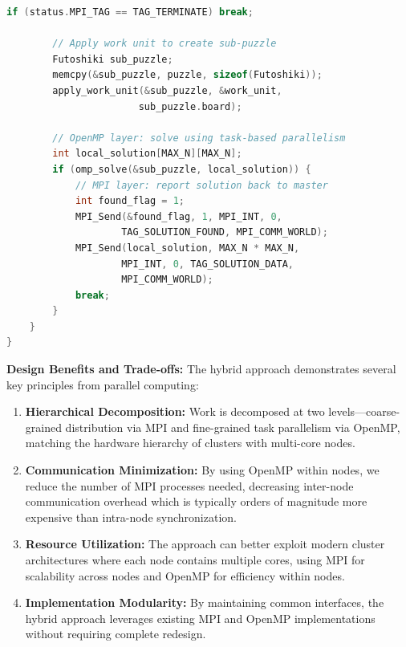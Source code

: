 \begin{enumerate}
\begin{lstlisting}[language=C, caption=Hybrid worker combining MPI and OpenMP, label={listing:hybrid_worker}]
        if (status.MPI_TAG == TAG_TERMINATE) break;
        
        // Apply work unit to create sub-puzzle
        Futoshiki sub_puzzle;
        memcpy(&sub_puzzle, puzzle, sizeof(Futoshiki));
        apply_work_unit(&sub_puzzle, &work_unit, 
                       sub_puzzle.board);
        
        // OpenMP layer: solve using task-based parallelism
        int local_solution[MAX_N][MAX_N];
        if (omp_solve(&sub_puzzle, local_solution)) {
            // MPI layer: report solution back to master
            int found_flag = 1;
            MPI_Send(&found_flag, 1, MPI_INT, 0, 
                    TAG_SOLUTION_FOUND, MPI_COMM_WORLD);
            MPI_Send(local_solution, MAX_N * MAX_N, 
                    MPI_INT, 0, TAG_SOLUTION_DATA, 
                    MPI_COMM_WORLD);
            break;
        }
    }
}
\end{lstlisting}

\textbf{Design Benefits and Trade-offs:}
The hybrid approach demonstrates several key principles from parallel computing:

\begin{enumerate}
    \item \textbf{Hierarchical Decomposition:} Work is decomposed at two levels—coarse-grained distribution via MPI and fine-grained task parallelism via OpenMP, matching the hardware hierarchy of clusters with multi-core nodes.
    
    \item \textbf{Communication Minimization:} By using OpenMP within nodes, we reduce the number of MPI processes needed, decreasing inter-node communication overhead which is typically orders of magnitude more expensive than intra-node synchronization.
    
    \item \textbf{Resource Utilization:} The approach can better exploit modern cluster architectures where each node contains multiple cores, using MPI for scalability across nodes and OpenMP for efficiency within nodes.
    
    \item \textbf{Implementation Modularity:} By maintaining common interfaces, the hybrid approach leverages existing MPI and OpenMP implementations without requiring complete redesign.
\end{enumerate}


\end{enumerate}
